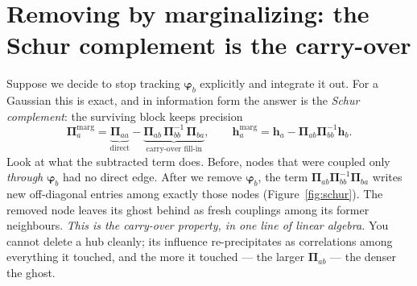 \documentclass[11pt]{article}
\newcommand{\Prec}{\bm{\Pi}}        %
\newcommand{\hvec}{\bm{h}}          %
\newcommand{\fvec}{\bm{\varphi}}    %
\theoremstyle{definition}
\begin{document}
\section{Removing by marginalizing: the Schur complement is the carry-over}
\label{sec:schur}

Suppose we decide to stop tracking $\fvec_b$ explicitly and integrate it
out. For a Gaussian this is exact, and in information form the answer is
the \emph{Schur complement}: the surviving block keeps precision
\begin{equation}
\Prec_{a}^{\text{marg}}
=\underbrace{\Prec_{aa}}_{\text{direct}}
-\underbrace{\Prec_{ab}\,\Prec_{bb}^{-1}\,\Prec_{ba}}_{\text{carry-over fill-in}},
\qquad
\hvec_a^{\text{marg}}=\hvec_a-\Prec_{ab}\Prec_{bb}^{-1}\hvec_b.
\label{eq:schur}
\end{equation}
Look at what the subtracted term does. Before, nodes that were coupled
only \emph{through} $\fvec_b$ had no direct edge. After we remove
$\fvec_b$, the term $\Prec_{ab}\Prec_{bb}^{-1}\Prec_{ba}$ writes new
off-diagonal entries among exactly those nodes (Figure~\ref{fig:schur}).
The removed node leaves its ghost behind as fresh couplings among its
former neighbours. \emph{This is the carry-over property, in one line of
linear algebra.} You cannot delete a hub cleanly; its influence
re-precipitates as correlations among everything it touched, and the more
it touched --- the larger $\Prec_{ab}$ --- the denser the ghost.
\end{document}
